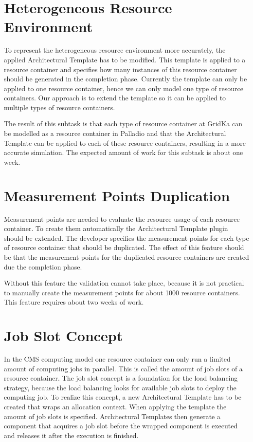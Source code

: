 \section{Heterogeneous Resource Environment}
To represent the heterogeneous resource environment more accurately, the applied Architectural Template has to be modified.
This template is applied to a resource container and specifies how many instances of this resource container should be generated in the completion phase.
Currently the template can only be applied to one resource container, hence we can only model one type of resource containers. Our approach is to extend the template so it can be applied to multiple types of resource containers.

The result of this subtask is that each type of resource container at GridKa can be modelled as a resource container in Palladio and that the Architectural Template can be applied to each of these resource containers, resulting in a more accurate simulation.
The expected amount of work for this subtask is about one week.

\section{Measurement Points Duplication}
Measurement points are needed to evaluate the resource usage of each resource container. To create them automatically the Architectural Template plugin should be extended. The developer specifies the measurement points for each type of resource container that should be duplicated. The effect of this feature should be that the measurement points for the duplicated resource containers are created due the completion phase.

Without this feature the validation cannot take place, because it is not practical to manually create the measurement points for about 1000 resource containers. This feature requires about two weeks of work.

\section{Job Slot Concept}
In the CMS computing model one resource container can only run a limited amount of computing jobs in parallel. This is called the amount of job slots of a resource container. The job slot concept is a foundation for the load balancing strategy, because the load balancing looks for available job slots to deploy the computing job. To realize this concept, a new Architectural Template has to be created that wraps an allocation context. When applying the template the amount of job slots is specified. Architectural Templates then generate a component that acquires a job slot before the wrapped component is executed and releases it after the execution is finished.

